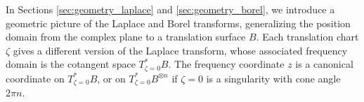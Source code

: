 \documentclass{article}
\theoremstyle{definition}
\theoremstyle{plain}
\begin{document}
In Sections \ref{sec:geometry_laplace} and \ref{sec:geometry_borel}, we introduce a geometric picture of the Laplace and Borel transforms, generalizing the position domain from the complex plane to a translation surface $B$. Each translation chart $\zeta$ gives a different version of the Laplace transform, whose associated frequency domain is the cotangent space $T^*_{\zeta = 0} B$. The frequency coordinate $z$ is a canonical coordinate on $T^*_{\zeta = 0}B$, or on $T^*_{\zeta = 0}B^{\otimes n}$ if $\zeta = 0$ is a singularity with cone angle $2\pi n$.
\begin{center}
\phaseSpaceLaplace
{}
\end{center}
\end{document}
